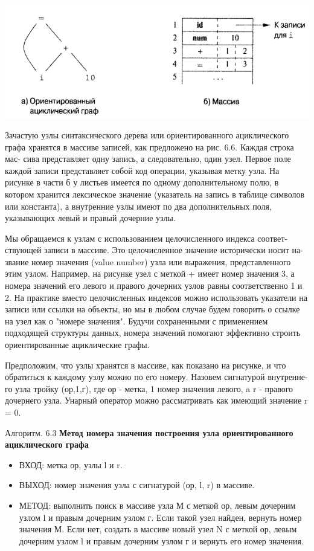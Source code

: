 
\includegraphics[width=\linewidth]{pics/graph_alg.png}

Зачастую узлы синтаксического дерева или ориентированного ациклического графа хранятся в массиве записей, как предложено на рис. 6.6. Каждая строка мас- сива представляет одну запись, а следовательно, один узел. Первое поле каждой записи представляет собой код операции, указывая метку узла. На рисунке в части б у листьев имеется по одному дополнительному полю, в котором хранится лексическое значение (указатель на запись в таблице символов или константа), а внутренние узлы имеют по два дополнительных поля, указывающих левый и правый дочерние узлы.

Мы обращаемся к узлам с использованием целочисленного индекса соответ- ствующей записи в массиве. Это целочисленное значение исторически носит на- звание номер значения (value number) узла или выражения, представленного этим узлом. Например, на рисунке узел с меткой + имеет номер значения 3, а номера значений его левого и правого дочерних узлов равны соответственно 1 и 2. На практике вместо целочисленных индексов можно использовать указатели на записи или ссылки на объекты, но мы в любом случае будем говорить о ссылке на узел как о "номере значения". Будучи сохраненными с применением подходящей структуры данных, номера значений помогают эффективно строить ориентированные ациклические графы.

Предположим, что узлы хранятся в массиве, как показано на рисунке, и что обратиться к каждому узлу можно по его номеру. Назовем сигнатурой внутренне- го узла тройку (ор,1,г), где ор - метка, 1 номер значения левого, a r - правого дочернего узла. Унарный оператор можно рассматривать как имеющий значение r = 0.

Алгоритм. 6.3 \textbf{Метод номера значения построения узла ориентированного ациклического графа}
\begin{itemize}
    \item ВХОД: метка ор, узлы l и r.
    \item ВЫХОД: номер значения узла с сигнатурой (ор, l, r) в массиве.
    \item МЕТОД: выполнить поиск в массиве узла М с меткой ор, левым дочерним узлом l и правым дочерним узлом г. Если такой узел найден, вернуть номер значения М. Если нет, создать в массиве новый узел N с меткой ор, левым дочерним узлом l и правым дочерним узлом г и вернуть его номер значения.
\end{itemize}

